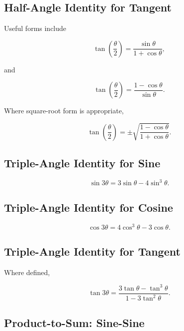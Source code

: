\subsection{Half-Angle Identity for Tangent}
\label{subsec:tangent-half-angle}

Useful forms include

\[
\boxed{
\tan
\left(
\frac{\theta}{2}
\right)
=
\frac{
\sin\theta
}{
1+\cos\theta
},
}
\]

and

\[
\boxed{
\tan
\left(
\frac{\theta}{2}
\right)
=
\frac{
1-\cos\theta
}{
\sin\theta
}.
}
\]

Where square-root form is appropriate,

\[
\boxed{
\tan
\left(
\frac{\theta}{2}
\right)
=
\pm
\sqrt{
\frac{
1-\cos\theta
}{
1+\cos\theta
}
}.
}
\]

\subsection{Triple-Angle Identity for Sine}
\label{subsec:sine-triple-angle}

\[
\boxed{
\sin3\theta
=
3\sin\theta
-
4\sin^3\theta.
}
\]

\subsection{Triple-Angle Identity for Cosine}
\label{subsec:cosine-triple-angle}

\[
\boxed{
\cos3\theta
=
4\cos^3\theta
-
3\cos\theta.
}
\]

\subsection{Triple-Angle Identity for Tangent}
\label{subsec:tangent-triple-angle}

Where defined,

\[
\boxed{
\tan3\theta
=
\frac{
3\tan\theta-\tan^3\theta
}{
1-3\tan^2\theta
}.
}
\]

\subsection{Product-to-Sum: Sine-Sine}
\label{subsec:product-to-sum-sine-sine}

